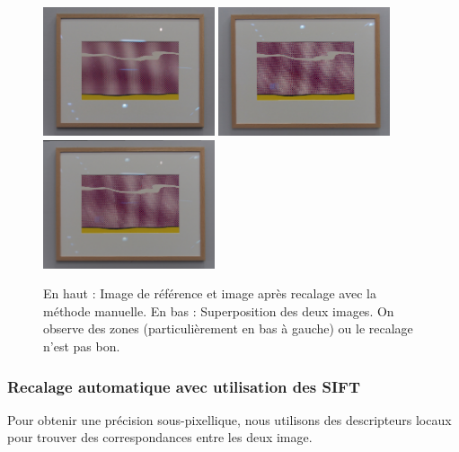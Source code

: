 \documentclass[12pt,a4paper]{article}
\begin{document}
\begin{figure}[H]
  \centering
  \includegraphics[width=0.45\textwidth]{Fig/User_reference.png}
  \includegraphics[width=0.45\textwidth]{Fig/User_fitted.png}\\ \vspace{0.1cm}
  \includegraphics[width=0.45\textwidth]{Fig/User_average.png}

  \caption{En haut : Image de référence et image après recalage avec la méthode manuelle. En bas : Superposition des deux images. On observe des zones (particulièrement en bas à gauche) ou le recalage n'est pas bon.}
\end{figure}

\subsubsection{Recalage automatique avec utilisation des  SIFT}

Pour obtenir une précision sous-pixellique, nous utilisons des descripteurs locaux pour trouver des correspondances entre les deux image.
\end{document}
